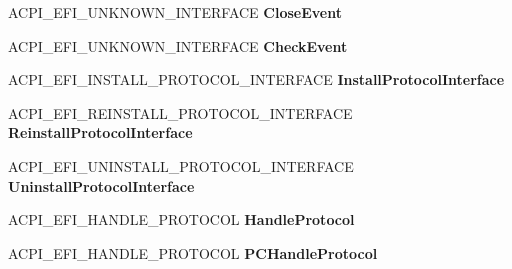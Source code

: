\begin{DoxyCompactItemize}
A\+C\+P\+I\+\_\+\+E\+F\+I\+\_\+\+U\+N\+K\+N\+O\+W\+N\+\_\+\+I\+N\+T\+E\+R\+F\+A\+CE {\bfseries Close\+Event}
\item 
\mbox{\label{struct___a_c_p_i___e_f_i___b_o_o_t___s_e_r_v_i_c_e_s_ab03c291d64cd5db4317c00b9f7d85134}} 
A\+C\+P\+I\+\_\+\+E\+F\+I\+\_\+\+U\+N\+K\+N\+O\+W\+N\+\_\+\+I\+N\+T\+E\+R\+F\+A\+CE {\bfseries Check\+Event}
\item 
\mbox{\label{struct___a_c_p_i___e_f_i___b_o_o_t___s_e_r_v_i_c_e_s_a890bda21f90be99d194b84feb23f86f6}} 
A\+C\+P\+I\+\_\+\+E\+F\+I\+\_\+\+I\+N\+S\+T\+A\+L\+L\+\_\+\+P\+R\+O\+T\+O\+C\+O\+L\+\_\+\+I\+N\+T\+E\+R\+F\+A\+CE {\bfseries Install\+Protocol\+Interface}
\item 
\mbox{\label{struct___a_c_p_i___e_f_i___b_o_o_t___s_e_r_v_i_c_e_s_a71b26c602c630850b610c35e6898540c}} 
A\+C\+P\+I\+\_\+\+E\+F\+I\+\_\+\+R\+E\+I\+N\+S\+T\+A\+L\+L\+\_\+\+P\+R\+O\+T\+O\+C\+O\+L\+\_\+\+I\+N\+T\+E\+R\+F\+A\+CE {\bfseries Reinstall\+Protocol\+Interface}
\item 
\mbox{\label{struct___a_c_p_i___e_f_i___b_o_o_t___s_e_r_v_i_c_e_s_a6c8d26bb507569559e6f1be055a75449}} 
A\+C\+P\+I\+\_\+\+E\+F\+I\+\_\+\+U\+N\+I\+N\+S\+T\+A\+L\+L\+\_\+\+P\+R\+O\+T\+O\+C\+O\+L\+\_\+\+I\+N\+T\+E\+R\+F\+A\+CE {\bfseries Uninstall\+Protocol\+Interface}
\item 
\mbox{\label{struct___a_c_p_i___e_f_i___b_o_o_t___s_e_r_v_i_c_e_s_acbdeb84728fe52a9bde6159dd89a5330}} 
A\+C\+P\+I\+\_\+\+E\+F\+I\+\_\+\+H\+A\+N\+D\+L\+E\+\_\+\+P\+R\+O\+T\+O\+C\+OL {\bfseries Handle\+Protocol}
\item 
\mbox{\label{struct___a_c_p_i___e_f_i___b_o_o_t___s_e_r_v_i_c_e_s_adb84222879b703656c589005d619e651}} 
A\+C\+P\+I\+\_\+\+E\+F\+I\+\_\+\+H\+A\+N\+D\+L\+E\+\_\+\+P\+R\+O\+T\+O\+C\+OL {\bfseries P\+C\+Handle\+Protocol}
\item 
\mbox{\label{struct___a_c_p_i___e_f_i___b_o_o_t___s_e_r_v_i_c_e_s_a8261852ae7bc53214be24900d13b5175}} 

\end{DoxyCompactItemize}
